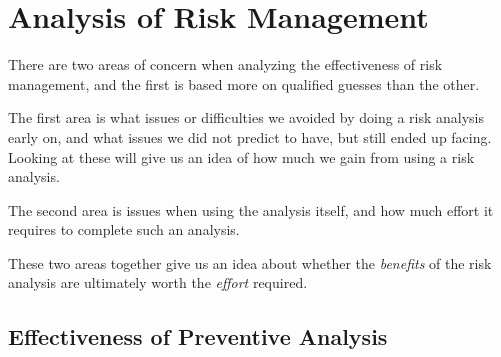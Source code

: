 \section{Analysis of Risk Management}

There are two areas of concern when analyzing the effectiveness of risk management, and the first is
based more on qualified guesses than the other.

The first area is what issues or difficulties we avoided by doing a risk analysis early on, and what
issues we did not predict to have, but still ended up facing. Looking at these will give us an idea
of how much we gain from using a risk analysis.

The second area is issues when using the analysis itself, and how much effort it requires to complete
such an analysis.

These two areas together give us an idea about whether the \emph{benefits} of the risk analysis are
ultimately worth the \emph{effort} required.

\subsection{Effectiveness of Preventive Analysis}

